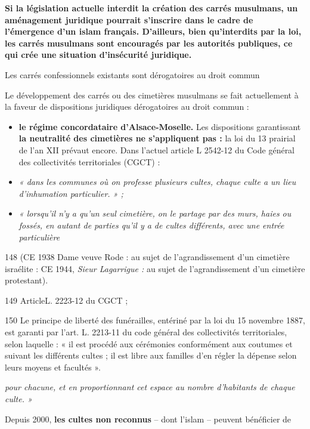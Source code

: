 \textbf{Si la législation actuelle interdit la création des carrés
musulmans, un aménagement juridique pourrait s'inscrire dans le cadre de
l'émergence d'un islam français. D'ailleurs, bien qu'interdits par la
loi, les carrés musulmans sont encouragés par les autorités publiques,
ce qui crée une situation d'insécurité juridique.}


Les carrés confessionnels existants sont dérogatoires au droit commun


Le développement des carrés ou des cimetières musulmans se fait
actuellement à la faveur de dispositions juridiques dérogatoires au
droit commun :


\begin{itemize}
\item
  \textbf{le régime concordataire d'Alsace-Moselle.} Les dispositions
  garantissant \textbf{la neutralité des cimetières ne s'appliquent pas
  :} la loi du 13 prairial de l'an XII prévaut encore. Dans l'actuel
  article L 2542-12 du Code général des collectivités territoriales
  (CGCT) :
\end{itemize}

\begin{itemize}
\item
  \emph{« dans les communes où on professe plusieurs cultes, chaque
  culte a un lieu d'inhumation particulier. » ;}
\item
  \emph{« lorsqu'il n'y a qu'un seul cimetière, on le partage par des
  murs, haies ou fossés, en autant de parties qu'il y a de cultes
  différents, avec une entrée particulière}
\end{itemize}


148 (CE 1938 Dame veuve Rode : au sujet de l'agrandissement d'un
cimetière israélite : CE 1944, \emph{Sieur Lagarrigue :} au sujet de
l'agrandissement d'un cimetière protestant).

149 ArticleL. 2223-12 du CGCT ;

150 Le principe de liberté des funérailles, entériné par la loi du 15
novembre 1887, est garanti par l'art. L. 2213-11 du code général des
collectivités territoriales, selon laquelle : « il est procédé aux
cérémonies conformément aux coutumes et suivant les différents cultes ;
il est libre aux familles d'en régler la dépense selon leurs moyens et
facultés ».



\emph{pour chacune, et en proportionnant cet espace au nombre
d'habitants de chaque culte. »}

Depuis 2000, \textbf{les cultes non reconnus} -- dont l'islam -- peuvent
bénéficier de


